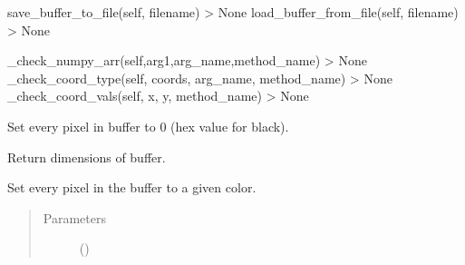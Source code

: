 \documentclass[letterpaper,10pt,english]{sphinxmanual}
\begin{document}
\begin{fulllineitems}
\begin{fulllineitems}
\end{fulllineitems}



\begin{fulllineitems}
\sphinxAtStartPar
save\_buffer\_to\_file(self, filename) \sphinxhyphen{}\textgreater{} None
load\_buffer\_from\_file(self, filename) \sphinxhyphen{}\textgreater{} None

\end{fulllineitems}



\begin{fulllineitems}
\sphinxAtStartPar
\_check\_numpy\_arr(self,arg1,arg\_name,method\_name) \sphinxhyphen{}\textgreater{} None
\_check\_coord\_type(self, coords, arg\_name, method\_name) \sphinxhyphen{}\textgreater{} None
\_check\_coord\_vals(self, x, y, method\_name) \sphinxhyphen{}\textgreater{} None

\end{fulllineitems}


\begin{fulllineitems}
\label{\detokenize{dpav:dpav.vbuffer.VBuffer.clear}}
\sphinxAtStartPar
Set every pixel in buffer to 0 (hex value for black).

\end{fulllineitems}


\begin{fulllineitems}
\label{\detokenize{dpav:dpav.vbuffer.VBuffer.dimensions}}
\sphinxAtStartPar
Return dimensions of buffer.

\end{fulllineitems}


\begin{fulllineitems}
\label{\detokenize{dpav:dpav.vbuffer.VBuffer.fill}}
\sphinxAtStartPar
Set every pixel in the buffer to a given color.
\begin{quote}\begin{description}
\item[{Parameters}] \leavevmode
\sphinxAtStartPar
{} () \textendash{} 


\end{description}
\end{quote}
\end{fulllineitems}
\end{fulllineitems}
\end{document}
